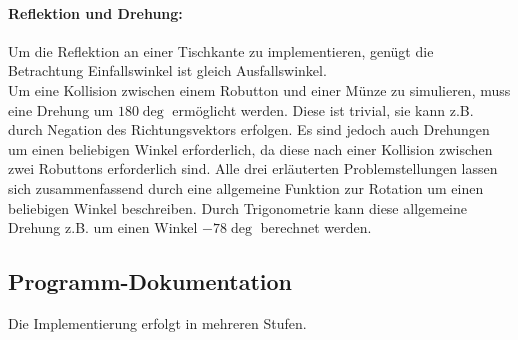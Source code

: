 \paragraph{Reflektion und Drehung:}
Um die Reflektion an einer Tischkante zu implementieren, genügt die Betrachtung Einfallswinkel ist gleich Ausfallswinkel. \\
Um eine Kollision zwischen einem Robutton und einer Münze zu simulieren, muss eine Drehung um $180\deg$ ermöglicht werden.
Diese ist trivial, sie kann z.B. durch Negation des Richtungsvektors erfolgen.
Es sind jedoch auch Drehungen um einen beliebigen Winkel erforderlich, da diese nach einer Kollision zwischen zwei Robuttons erforderlich sind.
Alle drei erläuterten Problemstellungen lassen sich zusammenfassend durch eine allgemeine Funktion zur Rotation um einen beliebigen Winkel beschreiben.
Durch Trigonometrie kann diese allgemeine Drehung z.B. um einen Winkel $-78\deg$ berechnet werden.
\newpage
\subsection{Programm-Dokumentation}
Die Implementierung erfolgt in mehreren Stufen.
